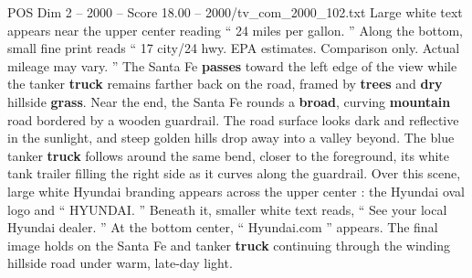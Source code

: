 \begin{textsample}{POS Dim 2 – 2000 – Score 18.00 – 2000/tv\_com\_2000\_102.txt}
Large white text appears near the upper center reading “ 24 miles per gallon. ” Along the bottom, small fine print reads “ 17 city/24 hwy.
EPA estimates.
Comparison only.
Actual mileage may vary. ” The Santa Fe \textbf{passes} toward the left edge of the view while the tanker \textbf{truck} remains farther back on the road, framed by \textbf{trees} and \textbf{dry} hillside \textbf{grass}.
Near the end, the Santa Fe rounds a \textbf{broad}, curving \textbf{mountain} road bordered by a wooden guardrail.
The road surface looks dark and reflective in the sunlight, and steep golden hills drop away into a valley beyond.
The blue tanker \textbf{truck} follows around the same bend, closer to the foreground, its white tank trailer filling the right side as it curves along the guardrail.
Over this scene, large white Hyundai branding appears across the upper center : the Hyundai oval logo and “ HYUNDAI. ” Beneath it, smaller white text reads, “ See your local Hyundai dealer. ” At the bottom center, “ Hyundai.com ” appears.
The final image holds on the Santa Fe and tanker \textbf{truck} continuing through the winding hillside road under warm, late-day light.

\end{textsample}
